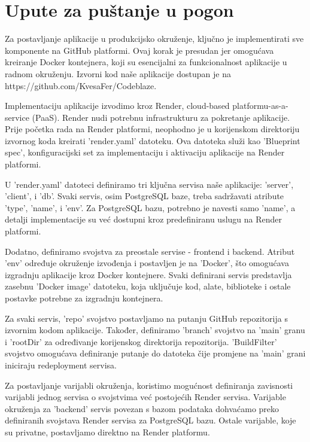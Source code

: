 			\eject 
		
		\section{Upute za puštanje u pogon}

		Za postavljanje aplikacije u produkcijsko okruženje, ključno je implementirati sve komponente na GitHub platformi. Ovaj korak je presudan jer omogućava kreiranje Docker kontejnera, koji su esencijalni za funkcionalnost aplikacije u radnom okruženju. Izvorni kod naše aplikacije dostupan je na https://github.com/KvesaFer/Codeblaze.

		Implementaciju aplikacije izvodimo kroz Render, cloud-based platformu-as-a-service (PaaS). Render nudi potrebnu infrastrukturu za pokretanje aplikacije. Prije početka rada na Render platformi, neophodno je u korijenskom direktoriju izvornog koda kreirati 'render.yaml' datoteku. Ova datoteka služi kao 'Blueprint spec', konfiguracijski set za implementaciju i aktivaciju aplikacije na Render platformi.

		U 'render.yaml' datoteci definiramo tri ključna servisa naše aplikacije: 'server', 'client', i 'db'. Svaki servis, osim PostgreSQL baze, treba sadržavati atribute 'type', 'name', i 'env'. Za PostgreSQL bazu, potrebno je navesti samo 'name', a detalji implementacije su već dostupni kroz predefiniranu uslugu na Render platformi.

		Dodatno, definiramo svojstva za preostale servise - frontend i backend. Atribut 'env' određuje okruženje izvođenja i postavljen je na 'Docker', što omogućava izgradnju aplikacije kroz Docker kontejnere. Svaki definirani servis predstavlja zasebnu 'Docker image' datoteku, koja uključuje kod, alate, biblioteke i ostale postavke potrebne za izgradnju kontejnera.

		Za svaki servis, 'repo' svojstvo postavljamo na putanju GitHub repozitorija s izvornim kodom aplikacije. Također, definiramo 'branch' svojstvo na 'main' granu i 'rootDir' za određivanje korijenskog direktorija repozitorija. 'BuildFilter' svojstvo omogućava definiranje putanje do datoteka čije promjene na 'main' grani iniciraju redeployment servisa.

		Za postavljanje varijabli okruženja, koristimo mogućnost definiranja zavisnosti varijabli jednog servisa o svojstvima već postojećih Render servisa. Varijable okruženja za 'backend' servis povezan s bazom podataka dohvaćamo preko definiranih svojstava Render servisa za PostgreSQL bazu. Ostale varijable, koje su privatne, postavljamo direktno na Render platformu.


